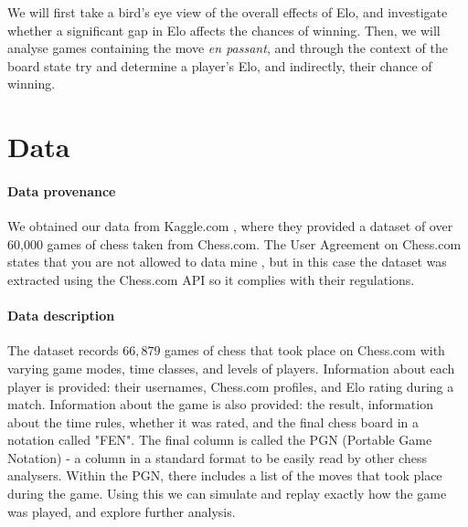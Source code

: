 \documentclass[10pt,a4paper]{article}
\begin{document}
\begin{multicols}{2}
We will first take a bird's eye view of the overall effects of Elo, and investigate whether a significant gap in Elo affects the chances of winning. Then, we will analyse games containing the move \textit{en passant}, and through the context of the board state try and determine a player's Elo, and indirectly, their chance of winning.

\section{Data}


\paragraph{Data provenance}
We obtained our data from Kaggle.com \cite{Kaggle}, where they provided a dataset of over 60,000 games of chess taken from Chess.com. The User Agreement on Chess.com states that you are not allowed to data mine \cite{ChessT&C}, but in this case the dataset was extracted using the Chess.com API so it complies with their regulations.


\paragraph{Data description}
The dataset records $66,879$ games of chess that took place on Chess.com with varying game modes, time classes, and levels of players. Information about each player is provided: their usernames, Chess.com profiles, and Elo rating during a match. Information about the game is also provided: the result, information about the time rules, whether it was rated, and the final chess board in a notation called "FEN". The final column is called the PGN (Portable Game Notation) - a column in a standard format to be easily read by other chess analysers. Within the PGN, there includes a list of the moves that took place during the game. Using this we can simulate and replay exactly how the game was played, and explore further analysis.



\end{multicols}
\end{document}
